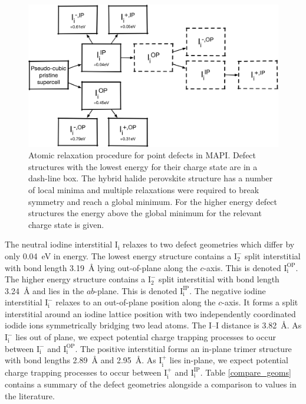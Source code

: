 \begin{figure}[h!]
\centering
  \includegraphics[width=0.7\columnwidth]{figures/ch6/relaxation_workflow.png}
  \caption[Atomic relaxation procedure for point defects in MAPI]{Atomic relaxation procedure for point defects in MAPI. Defect structures with the lowest energy for their charge state are in a dash-line box. The hybrid halide perovskite structure has a number of local minima and multiple relaxations were required to break symmetry and reach a global minimum. For the higher energy defect structures the energy above the global minimum for the relevant charge state is given.}
\label{relaxation_workflow}
\end{figure}

The neutral iodine interstitial $\mathrm{I}_\mathrm{i}$ relaxes to two defect geometries which differ by only \SI{0.04}{\electronvolt} in energy. The lowest energy structure contains a $\mathrm{I}_2^-$ split interstitial with bond length \SI{3.19}{\angstrom} lying out-of-plane along the $c$-axis. This is denoted $\mathrm{I}_\mathrm{i}^{\textrm{OP}}$. The higher energy structure contains a $\mathrm{I}_2^-$ split interstitial with bond length \SI{3.24}{\angstrom} and lies in the $ab$-plane. This is denoted $\mathrm{I}_\mathrm{i}^{\textrm{IP}}$. The negative iodine interstitial 
$\mathrm{I}_\mathrm{i}^-$ relaxes to an out-of-plane position along the $c$-axis. It forms a split interstitial around an iodine lattice position with two independently coordinated iodide ions symmetrically bridging two lead atoms. The I--I distance is \SI{3.82}{\angstrom}. As $\mathrm{I}_\mathrm{i}^-$ lies out of plane, we expect potential charge trapping processes to occur between $\mathrm{I}_\mathrm{i}^-$ and $\mathrm{I}_\mathrm{i}^{\textrm{OP}}$. The positive interstitial forms an in-plane trimer structure with bond lengths \SI{2.89}{\angstrom} and \SI{2.95}{\angstrom}. As $\mathrm{I}_\mathrm{i}^+$ lies in-plane, we expect potential charge trapping processes to occur between $\mathrm{I}_\mathrm{i}^+$ and $\mathrm{I}_\mathrm{i}^{\textrm{IP}}$.
Table \ref{compare_geoms} contains a summary of the defect geometries alongside a comparison to values in the literature.

